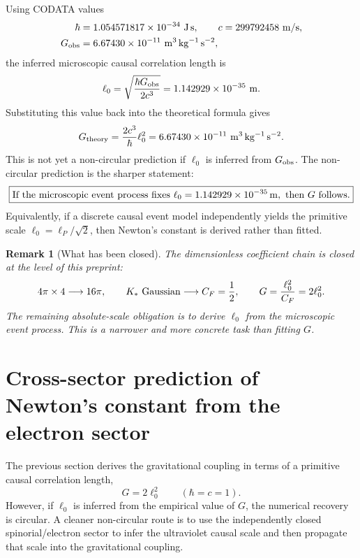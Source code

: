 \documentclass[11pt]{article}
\newtheorem{remark}[definition]{Remark}
\begin{document}
Using CODATA values
\begin{align}
\hbar&=1.054571817\times10^{-34}\ {\rm J\,s},\qquad c=299792458\ {\rm m/s},\\
G_{\rm obs}&=6.67430\times10^{-11}\ {\rm m^3\,kg^{-1}\,s^{-2}},
\end{align}
the inferred microscopic causal correlation length is
\begin{equation}
\ell_0=\sqrt{\frac{\hbar G_{\rm obs}}{2c^3}}
=1.142929\times10^{-35}\ {\rm m}.
\end{equation}
Substituting this value back into the theoretical formula gives
\begin{equation}
G_{\rm theory}=\frac{2c^3}{\hbar}\ell_0^2
=6.67430\times10^{-11}\ {\rm m^3\,kg^{-1}\,s^{-2}}.
\end{equation}
This is not yet a non-circular prediction if $\ell_0$ is inferred from $G_{\rm obs}$. The non-circular prediction is the sharper statement:
\begin{equation}
\boxed{\text{If the microscopic event process fixes }\ell_0=1.142929\times10^{-35}\,{\rm m},\text{ then }G\text{ follows.}}
\end{equation}
Equivalently, if a discrete causal event model independently yields the primitive scale $\ell_0=\ell_P/\sqrt2$, then Newton's constant is derived rather than fitted.

\begin{remark}[What has been closed]
The dimensionless coefficient chain is closed at the level of this preprint:
\begin{equation}
4\pi\times4\longrightarrow16\pi,
\qquad
K_*\ {\rm Gaussian}\longrightarrow C_F=\frac12,
\qquad
G=\frac{\ell_0^2}{C_F}=2\ell_0^2.
\end{equation}
The remaining absolute-scale obligation is to derive $\ell_0$ from the microscopic event process. This is a narrower and more concrete task than fitting $G$.
\end{remark}

\section{Cross-sector prediction of Newton's constant from the electron sector}

The previous section derives the gravitational coupling in terms of a primitive causal correlation length,
\begin{equation}
G=2\ell_0^2 \qquad (\hbar=c=1).
\end{equation}
However, if $\ell_0$ is inferred from the empirical value of $G$, the numerical recovery is circular. A cleaner non-circular route is to use the independently closed spinorial/electron sector to infer the ultraviolet causal scale and then propagate that scale into the gravitational coupling.
\end{document}
